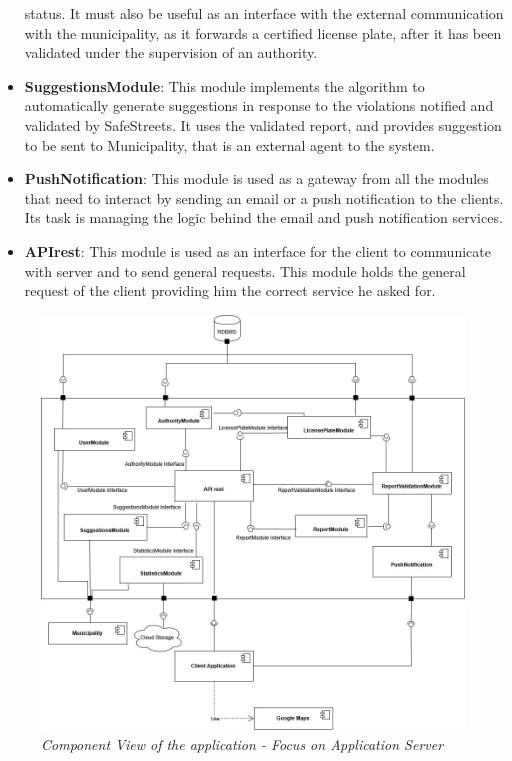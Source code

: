 \begin{itemize}
  status. It must also be useful as an interface with the external communication with the municipality, as it forwards a 
  certified license plate, after it has been validated under the supervision of an authority.
  \item \textbf{SuggestionsModule}: This module implements the algorithm to automatically generate suggestions in response to the
  violations notified and validated by SafeStreets. It uses the validated report, and provides suggestion to be sent to Municipality,
  that is an external agent to the system.
  \item \textbf{PushNotification}: This module is used as a gateway from all the modules that need to interact by 
  sending an email or a push notification to the clients. Its task is managing the logic behind the email and push notification services.
  \item \textbf{APIrest}: This module is used as an interface for the client to communicate with server and to send
  general requests. This module holds the general request of the client providing him the correct service he asked for.
\end{itemize}

\begin{figure}[H]
  \centering
  \includegraphics[origin=c,width=\textwidth]{DD_Images/ComponentView/componentViewServerZoom.jpg}
  \caption{\textit{Component View of the application - Focus on Application Server}}
\end{figure}


